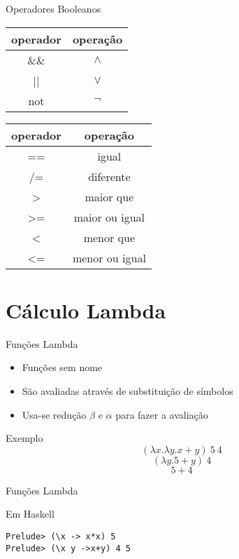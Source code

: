 \documentclass{beamer}
\begin{document}
	\begin{frame}{Operadores Booleanos}
	 
	 \begin{table}[h]
	  \begin{tabular}{c | c}
	   operador & operação\\
	   \hline
	   \&\& & $\land$ \\
	   || & $\lor$ \\
	   not & $\lnot$ \\
	  \end{tabular}
	 \end{table}
	 
	 \begin{table}[h]
	  \begin{tabular}{c | c}
	   operador & operação\\
	   \hline
	   == & igual \\
	   /= & diferente \\
	   > & maior que \\
	   >= & maior ou igual \\
	   < & menor que \\
	   <= & menor ou igual \\
	  \end{tabular}
	 \end{table} 
	\end{frame}
	
	\section{Cálculo Lambda}

		\begin{frame}{Funções Lambda}
		 
		 \begin{itemize}
		  \item Funções sem nome
		  \item São avaliadas através de substituição de símbolos
		  \item Usa-se redução $\beta$ e $\alpha$ para fazer a avaliação
		 \end{itemize}
		 
		 \begin{block}{Exemplo}
		  \[(\lambda x. \lambda y. x+y)~ 5~ 4\]
		  \[(\lambda y. 5+y)~ 4\]
		  \[5+4\]		  
		 \end{block}		 
		\end{frame}
		
	\begin{frame}[fragile]{Funções Lambda}
	 
	 \begin{block}{Em Haskell}
	  \begin{lstlisting}	
Prelude> (\x -> x*x) 5
Prelude> (\x y ->x+y) 4 5
	  \end{lstlisting}	  
	 \end{block}
	\end{frame}
\end{document}
